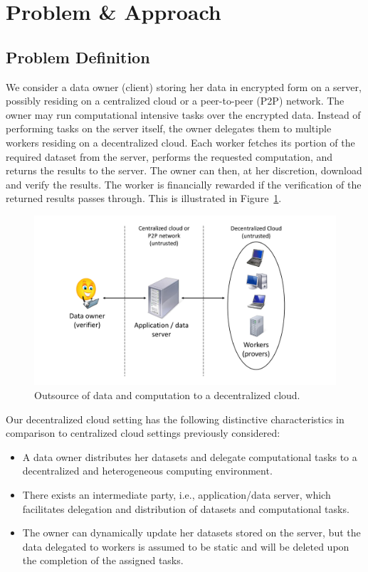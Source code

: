 \section{Problem \& Approach} \label{sect:overview}

\subsection{Problem Definition} \label{sect:problem}

We consider a data owner (client) storing her data in encrypted form on a server, possibly residing on a centralized cloud or a peer-to-peer (P2P) network.
The owner may run computational intensive tasks over the encrypted data.
Instead of performing tasks on the server itself, the owner delegates them to multiple workers residing on a decentralized cloud. 
Each worker fetches its portion of the required dataset from the server, performs the requested computation, and returns the results to the server.
The owner can then, at her discretion, download and verify the results.
The worker is financially rewarded if the verification of the returned results passes through.
This is illustrated in Figure~\ref{fig:model}.

\begin{figure}[h!]\centering
  \includegraphics[scale=0.30]{model.pdf}
  \caption{Outsource of data and computation to a decentralized cloud.}
  \label{fig:model}
\end{figure}

Our decentralized cloud setting has the following distinctive characteristics in comparison to centralized cloud settings previously considered:
\begin{itemize}
 \item A data owner distributes her datasets and delegate computational tasks to a decentralized and heterogeneous computing environment.
 \item There exists an intermediate party, i.e., application/data server, which facilitates delegation and distribution of datasets and computational tasks.
 \item The owner can dynamically update her datasets stored on the server, but the data delegated to workers is assumed to be static and will be deleted upon the completion of the assigned tasks.
\end{itemize}


